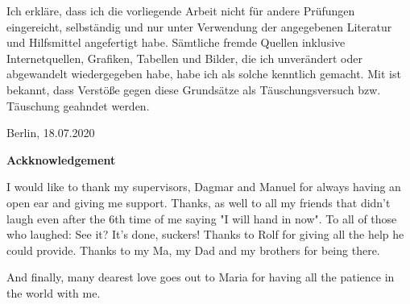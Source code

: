 \documentclass[10pt]{article}
\begin{document}
Ich erkl\"are, dass ich die vorliegende Arbeit nicht f\"ur andere Pr\"ufungen eingereicht, selbst\"andig und nur unter Verwendung der angegebenen Literatur und Hilfsmittel angefertigt habe. S\"amtliche fremde Quellen inklusive Internetquellen, Grafiken, Tabellen und Bilder, die ich unver\"andert oder abgewandelt wiedergegeben habe, habe ich als solche kenntlich gemacht. Mit ist bekannt, dass Verst\"oße gegen diese Grunds\"atze als T\"auschungsversuch bzw. T\"auschung geahndet werden.



Berlin, 18.07.2020


\newpage
\huge{\textbf{Ackknowledgement}} \\
\large{
I would like to thank my supervisors, Dagmar and Manuel for always having an open ear and giving me support. 
Thanks, as well to all my friends that didn't laugh even after the 6th time of me saying "I will hand in now".
To all of those who laughed: See it? It's done, suckers! 
Thanks to Rolf for giving all the help he could provide.
Thanks to my Ma, my Dad and my brothers for being there.

And finally, many dearest love goes out to Maria for having all the patience in the world with me. 
}
\end{document}
